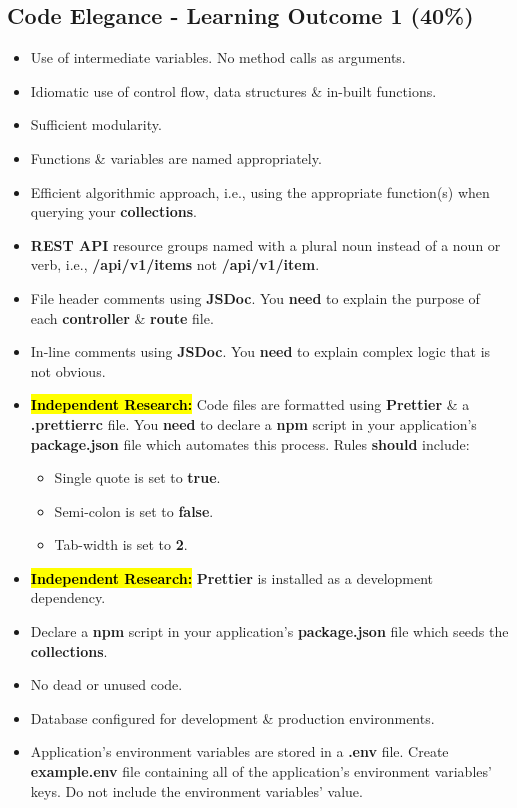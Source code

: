 \documentclass{article}
\begin{document}
\subsection*{Code Elegance - Learning Outcome 1 (40\%)}
\begin{itemize}
	\item Use of intermediate variables. No method calls as arguments.
	\item Idiomatic use of control flow, data structures \& in-built functions.
	\item Sufficient modularity.
	\item Functions \& variables are named appropriately.
	\item Efficient algorithmic approach, i.e., using the appropriate function(s) when querying your \textbf{collections}.
	\item \textbf{REST API} resource groups named with a plural noun instead of a noun or verb, i.e., \textbf{/api/v1/items} not \textbf{/api/v1/item}.
	\item File header comments using \textbf{JSDoc}. You \textbf{need} to explain the purpose of each \textbf{controller} \& \textbf{route} file.
	\item In-line comments using \textbf{JSDoc}. You \textbf{need} to explain complex logic that is not obvious.
	\item \hl{\textbf{Independent Research:}} Code files are formatted using \textbf{Prettier} \& a \textbf{.prettierrc} file. You \textbf{need} to declare a \textbf{npm} script in your application's \textbf{package.json} file which automates this process. Rules \textbf{should} include:
	      \begin{itemize}
		      \item Single quote is set to \textbf{true}.
		      \item Semi-colon is set to \textbf{false}.
		      \item Tab-width is set to \textbf{2}.
	      \end{itemize}
	\item \hl{\textbf{Independent Research:}} \textbf{Prettier} is installed as a development dependency.
	\item Declare a \textbf{npm} script in your application's \textbf{package.json} file which seeds the \textbf{collections}.
	\item No dead or unused code.
	\item Database configured for development \& production environments.
	\item Application's environment variables are stored in a \textbf{.env} file. Create \textbf{example.env} file containing all of the application's environment variables' keys. Do not include the environment variables' value.    
\end{itemize}
\end{document}
